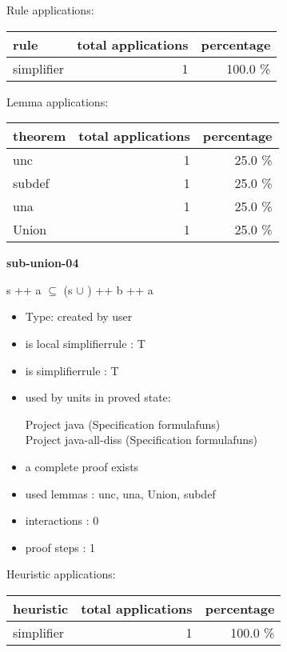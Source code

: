 \documentclass[a4paper]{article}
\begin{document}
Rule applications:

\begin{supertabular}{l|r|r}
rule	        & total applications & percentage \\ \hline
simplifier & 1 & 100.0 \% \\

\end{supertabular}

Lemma applications:

\begin{supertabular}{l|r|r}
theorem	        & total applications & percentage \\ \hline
unc & 1 & 25.0 \% \\
subdef & 1 & 25.0 \% \\
una & 1 & 25.0 \% \\
Union & 1 & 25.0 \% \\

\end{supertabular}
\pagebreak

{\LARGE\bf sub-union-04}\label{lemma-sub-union-04}

\medskip

 \Fol s ++ a $\subseteq$ (s $\cup$ ) ++ b ++ a

\begin{itemize}

\item Type: created by user

\item is local simplifierrule : T
\item is simplifierrule : T
\item used by units in proved state:

Project java (Specification formulafuns) \\
Project java-all-diss (Specification formulafuns)
\item       a complete proof exists
\item       used lemmas  : unc, una, Union, subdef
\item       interactions : 0
\item       proof steps  : 1
\end{itemize}

\medskip


Heuristic applications:

\begin{supertabular}{l|r|r}
heuristic	& total applications & percentage \\ \hline
simplifier & 1 & 100.0 \% \\

\end{supertabular}
\end{document}
